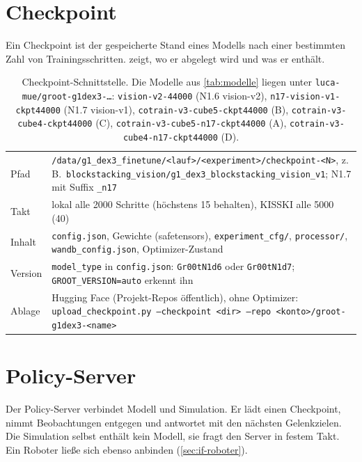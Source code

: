 \section{Checkpoint}
\label{sec:if-checkpoint}

Ein Checkpoint ist der gespeicherte Stand eines Modells nach einer bestimmten Zahl von
Trainingsschritten.  zeigt, wo er abgelegt wird und was er enthält.

\begin{table}[htb]
  \centering
  \begin{tabularx}{\linewidth}{lX}
    \toprule
    Pfad & \texttt{/data/g1\_dex3\_finetune/<lauf>/<experiment>/checkpoint-<N>}, z.\,B.\
           \texttt{blockstacking\_vision/g1\_dex3\_blockstacking\_vision\_v1}; N1.7 mit Suffix
           \texttt{\_n17} \\
    Takt & lokal alle 2000 Schritte (höchstens 15 behalten), KISSKI alle 5000 (40) \\
    Inhalt & \texttt{config.json}, Gewichte (safetensors), \texttt{experiment\_cfg/},
             \texttt{processor/}, \texttt{wandb\_config.json}, Optimizer-Zustand \\
    Version & \texttt{model\_type} in \texttt{config.json}: \texttt{Gr00tN1d6} oder
              \texttt{Gr00tN1d7}; \texttt{GROOT\_VERSION=auto} erkennt ihn \\
    Ablage & Hugging Face (Projekt-Repos öffentlich), ohne Optimizer:
             \texttt{upload\_checkpoint.py --checkpoint <dir> --repo
             <konto>/groot-g1dex3-<name>} \\
    \bottomrule
  \end{tabularx}
  \caption[Checkpoint-Schnittstelle]{Checkpoint-Schnittstelle. Die Modelle aus
    \cref{tab:modelle} liegen unter \texttt{luca-mue/groot-g1dex3-…}:
    \texttt{vision-v2-44000} (N1.6 vision-v2), \texttt{n17-vision-v1-ckpt44000}
    (N1.7 vision-v1), \texttt{cotrain-v3-cube5-ckpt44000} (B), \texttt{cotrain-v3-cube4-ckpt44000}
    (C), \texttt{cotrain-v3-cube5-n17-ckpt44000} (A), \texttt{cotrain-v3-cube4-n17-ckpt44000} (D).}
  \label{tab:if-checkpoint}
\end{table}

\section{Policy-Server}
\label{sec:if-server}
\label{sec:simulation}

Der Policy-Server verbindet Modell und Simulation. Er lädt einen Checkpoint, nimmt
Beobachtungen entgegen und antwortet mit den nächsten Gelenkzielen. Die Simulation selbst
enthält kein Modell, sie fragt den Server in festem Takt. Ein Roboter ließe sich ebenso
anbinden (\cref{sec:if-roboter}).


